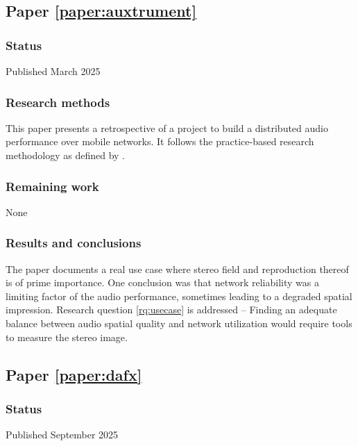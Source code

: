 \documentclass[a4paper]{article}
\newcommand{\citeauthorandnumber}[1]{\citeauthor{#1} \cite{#1}}
\begin{document}
\begin{refsection} 

\subsection*{Paper \ref{paper:auxtrument}}

\textbf{}

\subsubsection*{Status}
Published March 2025

\subsubsection*{Research methods}
This paper presents a retrospective of a project to build a distributed audio performance over mobile networks. It follows the practice-based research methodology as defined by \citeauthorandnumber{candyPracticeBasedResearch2006}.

\subsubsection*{Remaining work}
None

\subsubsection*{Results and conclusions}
The paper documents a real use case where stereo field and reproduction thereof is of prime importance. One conclusion was that network reliability was a limiting factor of the audio performance, sometimes leading to a degraded spatial impression. Research question \ref{rq:usecase} is addressed -- Finding an adequate balance between audio spatial quality and network utilization would require tools to measure the stereo image.


\subsection*{Paper \ref{paper:dafx}}

\textbf{}

\subsubsection*{Status}
Published September 2025


\end{refsection}
\end{document}
